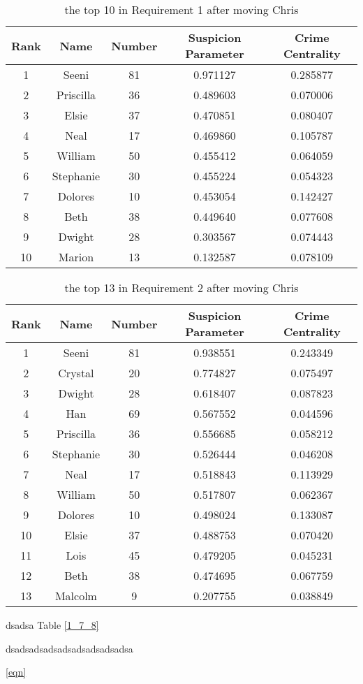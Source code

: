 \documentclass[12pt]{article}
\begin{document}
\begin{table}[h]
\centering
\begin{tabular}{c|c|c|c|c}
\hline
Rank & Name & Number & Suspicion Parameter & Crime Centrality \\
\hline
1 & Seeni & 81 & 0.971127 & 0.285877 \\
2 & Priscilla & 36 & 0.489603 & 0.070006 \\
3 & Elsie & 37 & 0.470851 & 0.080407 \\
4 & Neal & 17 & 0.469860 & 0.105787 \\
5 & William & 50 & 0.455412 & 0.064059 \\
6 & Stephanie & 30 & 0.455224 & 0.054323 \\
7 & Dolores & 10 & 0.453054 & 0.142427 \\
8 & Beth & 38 & 0.449640 & 0.077608 \\
9 & Dwight & 28 & 0.303567 & 0.074443 \\
10 & Marion & 13 & 0.132587 & 0.078109 \\
\hline
\end{tabular}
\caption{the top 10 in Requirement 1 after moving Chris}
\label{2_7_8}
\end{table}

\begin{table}[h]
\centering
\begin{tabular}{c|c|c|c|c}
\hline
Rank & Name & Number & Suspicion Parameter & Crime Centrality \\
\hline
1 & Seeni & 81 & 0.938551 & 0.243349 \\
2 & Crystal & 20 & 0.774827 & 0.075497 \\
3 & Dwight & 28 & 0.618407 & 0.087823 \\
4 & Han & 69 & 0.567552 & 0.044596 \\
5 & Priscilla & 36 & 0.556685 & 0.058212 \\
6 & Stephanie & 30 & 0.526444 & 0.046208 \\
7 & Neal & 17 & 0.518843 & 0.113929 \\
8 & William & 50 & 0.517807 & 0.062367 \\
9 & Dolores & 10 & 0.498024 & 0.133087 \\
10 & Elsie & 37 & 0.488753 & 0.070420 \\
11 & Lois & 45 & 0.479205 & 0.045231 \\
12 & Beth & 38 & 0.474695 & 0.067759 \\ 
13 & Malcolm & 9 & 0.207755 & 0.038849 \\
\hline
\end{tabular}
\caption{the top 13 in Requirement 2 after moving Chris}
\label{2_8_7}
\end{table}

dsadsa Table \ref{1_7_8}

dsadsadsadsadsadsadsadsadsa  


\eqref{eqn}
\end{document}

